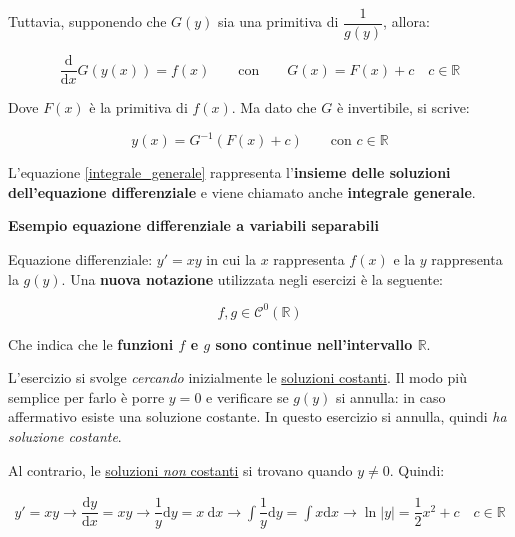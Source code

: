 \documentclass[a4paper]{article}
\begin{document}
	\noindent
	Tuttavia, supponendo che $G(y)$ sia una primitiva di $\dfrac{1}{g(y)}$, allora:
	
	\begin{equation*}
		\dfrac{\mathrm{d}}{\mathrm{d}x} G\left(y(x)\right) = f(x) \hspace{2em} \text{con} \hspace{2em} G(x) = F(x) + c \hspace{1em} c\in\mathbb{R}
	\end{equation*}
	
	\noindent
	Dove $F(x)$ è la primitiva di $f(x)$. Ma dato che $G$ è invertibile, si scrive:
	
	\begin{equation}\label{integrale_generale}
		y(x) = G^{-1} \left(F(x) + c\right) \hspace{2em} \text{con } c \in \mathbb{R}
	\end{equation}

	\noindent
	L'equazione \ref{integrale_generale} rappresenta l'\textbf{insieme delle soluzioni dell'equazione differenziale} e viene chiamato anche \textcolor{Red3}{\textbf{integrale generale}}.
	
	\newpage
	
	\begin{center}
		\large \textcolor{Green4}{\textbf{Esempio equazione differenziale a variabili separabili}}
	\end{center}
	
	\noindent
	Equazione differenziale: $y' = x y$ in cui la $x$ rappresenta $f(x)$ e la $y$ rappresenta la $g(y)$. Una \textbf{nuova notazione} utilizzata negli esercizi è la seguente:
	
	\begin{equation*}
		f, g \in \mathcal{C}^{0}(\mathbb{R})
	\end{equation*}

	\noindent
	Che indica che le \textbf{funzioni $f$ e $g$ sono continue nell'intervallo $\mathbb{R}$}.
	
	L'esercizio si svolge \emph{cercando} inizialmente le \underline{soluzioni costanti}. Il modo più semplice per farlo è porre $y=0$ e verificare se $g(y)$ si annulla: in caso affermativo esiste una soluzione costante. In questo esercizio si annulla, quindi \emph{ha soluzione costante}.
	
	Al contrario, le \underline{soluzioni \emph{non} costanti} si trovano quando $y \ne 0$. Quindi:
	
	\begin{gather*}
		y' = xy \rightarrow \dfrac{\mathrm{d}y}{\mathrm{d}x} = xy \rightarrow \dfrac{1}{y} \mathrm{d}y = x \: \mathrm{d}x \rightarrow \displaystyle \int \dfrac{1}{y} \mathrm{d}y = \int x \mathrm{d} x \rightarrow \ln |y| = \dfrac{1}{2} x^{2} + c \hspace{1em} c\in\mathbb{R}
	\end{gather*}
\end{document}
